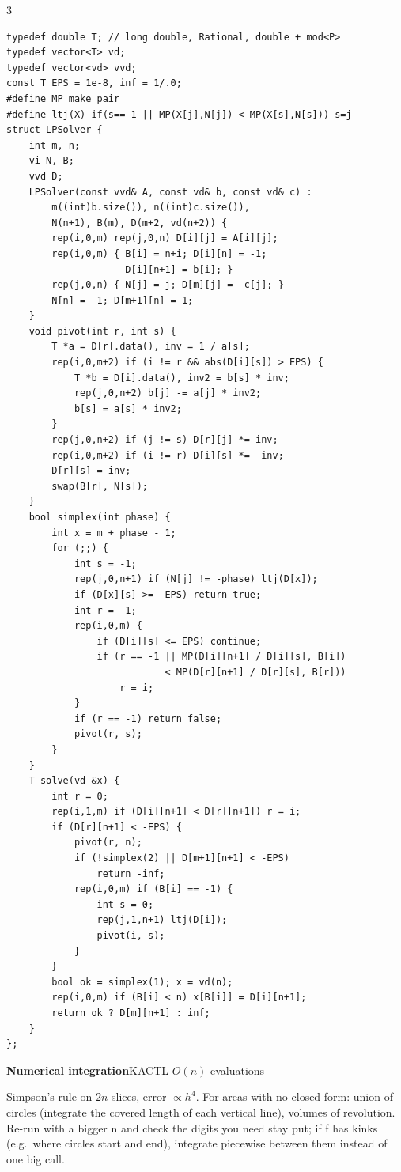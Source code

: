 \documentclass[9pt,a4paper]{extarticle}
\newcommand{\entry}[3]{%
  \addcontentsline{toc}{subsection}{#1}%
  \vspace{0.8ex}%
  \noindent\colorbox{hdbg}{\parbox{\dimexpr\columnwidth-2\fboxsep}{%
    \strut\textbf{#1}\hfill{\footnotesize\textsf{#2}}}}\par
  \vspace{0.4ex}%
  {\footnotesize #3\par}%
}
\newcommand{\code}[1]{{\ttfamily\small #1}}
\begin{document}
\begin{multicols*}{3}
\begin{lstlisting}
typedef double T; // long double, Rational, double + mod<P>
typedef vector<T> vd;
typedef vector<vd> vvd;
const T EPS = 1e-8, inf = 1/.0;
#define MP make_pair
#define ltj(X) if(s==-1 || MP(X[j],N[j]) < MP(X[s],N[s])) s=j
struct LPSolver {
    int m, n;
    vi N, B;
    vvd D;
    LPSolver(const vvd& A, const vd& b, const vd& c) :
        m((int)b.size()), n((int)c.size()),
        N(n+1), B(m), D(m+2, vd(n+2)) {
        rep(i,0,m) rep(j,0,n) D[i][j] = A[i][j];
        rep(i,0,m) { B[i] = n+i; D[i][n] = -1;
                     D[i][n+1] = b[i]; }
        rep(j,0,n) { N[j] = j; D[m][j] = -c[j]; }
        N[n] = -1; D[m+1][n] = 1;
    }
    void pivot(int r, int s) {
        T *a = D[r].data(), inv = 1 / a[s];
        rep(i,0,m+2) if (i != r && abs(D[i][s]) > EPS) {
            T *b = D[i].data(), inv2 = b[s] * inv;
            rep(j,0,n+2) b[j] -= a[j] * inv2;
            b[s] = a[s] * inv2;
        }
        rep(j,0,n+2) if (j != s) D[r][j] *= inv;
        rep(i,0,m+2) if (i != r) D[i][s] *= -inv;
        D[r][s] = inv;
        swap(B[r], N[s]);
    }
    bool simplex(int phase) {
        int x = m + phase - 1;
        for (;;) {
            int s = -1;
            rep(j,0,n+1) if (N[j] != -phase) ltj(D[x]);
            if (D[x][s] >= -EPS) return true;
            int r = -1;
            rep(i,0,m) {
                if (D[i][s] <= EPS) continue;
                if (r == -1 || MP(D[i][n+1] / D[i][s], B[i])
                            < MP(D[r][n+1] / D[r][s], B[r]))
                    r = i;
            }
            if (r == -1) return false;
            pivot(r, s);
        }
    }
    T solve(vd &x) {
        int r = 0;
        rep(i,1,m) if (D[i][n+1] < D[r][n+1]) r = i;
        if (D[r][n+1] < -EPS) {
            pivot(r, n);
            if (!simplex(2) || D[m+1][n+1] < -EPS)
                return -inf;
            rep(i,0,m) if (B[i] == -1) {
                int s = 0;
                rep(j,1,n+1) ltj(D[i]);
                pivot(i, s);
            }
        }
        bool ok = simplex(1); x = vd(n);
        rep(i,0,m) if (B[i] < n) x[B[i]] = D[i][n+1];
        return ok ? D[m][n+1] : inf;
    }
};
\end{lstlisting}

\entry{Numerical integration}{KACTL \quad $O(n)$ evaluations}{%
Simpson's rule on $2n$ slices, error $\propto h^4$. For areas with no closed form:
union of circles (integrate the covered length of each vertical line), volumes of
revolution. Re-run with a bigger \code{n} and check the digits you need stay put; if
\code{f} has kinks (e.g.\ where circles start and end), integrate piecewise between
them instead of one big call.}


\end{multicols*}
\end{document}
